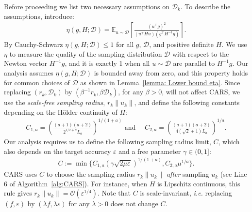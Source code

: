 Before proceeding we list two necessary assumptions on $\mathcal{D}_k$. To describe the assumptions,
introduce:
\begin{align}
    \eta( g, H ; \mathcal{D}) = \mathbb{E}_{u \sim \mathcal{D}} \left[ \frac{(u^\top g)^2}{(u^{\top} H u)  (g^{\top}H^{-1}g) } \right]. \label{eq:Def of eta}
\end{align}
By Cauchy-Schwarz $\eta(g,H;\mathcal{D}) \leq 1$ for all $g$, $\mathcal{D}$, and positive definite $H$.
We use $\eta$ to measure the quality of the sampling distribution $\mathcal{D}$ with respect to the Newton vector $H^{-1}g$, and it is exactly 1 when all $u\sim \mathcal{D}$ are parallel to $H^{-1}g$. Our analysis assumes $\eta(g,H;\mathcal{D})$ is bounded away from zero, and this property holds for common choices of $\mathcal{D}$ as shown in Lemma~\ref{lemma: Lower bound eta}. Since
replacing $(r_k, \mathcal{D}_k)$ by $(\beta^{-1}r_k, \beta\mathcal{D}_k)$, for any $\beta >0$, will not affect CARS, we use the {\em{scale-free sampling radius}}, $r_k\|u_k\|$,
and define the following constants depending on the H\"{o}lder continuity of $H$:
\begin{align*}
    C_{1,a} = \left(\frac{(a+1)(a+2)}{2^{1/2+a}L_{a}}\right)^{1/(1+a)} \text{ and }\quad C_{2,a} = \left( \frac{(a+1)(a+2)}{4(\sqrt{2}+1)L_{a}} \right)^{1/a}.
\end{align*}
Our analysis requires us to define the following sampling radius limit, $C$, which also depends on the target accuracy $\varepsilon$ and a free parameter $\gamma \in (0,1]$:
\begin{align}\label{eq: Scale-Free Sampling Radius Limit}
    C := \min \{ C_{1,a} (\gamma \sqrt{2\mu \varepsilon})^{1/(1+a)}, C_{2,a} \mu^{1/a} \}.
\end{align}
CARS uses $C$ to choose the sampling radius $r_k\|u_k\|$ {\em after} sampling $u_k$ (see Line 6 of Algorithm~\ref{alg:CARS}). For instance, when $H$ is Lipschitz continuous, this rule gives $r_k \|u_k\| = \mathcal{O}(\varepsilon^{1/4})$. Note that $C$ is scale-invariant, {\em i.e.} replacing $(f, \varepsilon)$ by $(\lambda f, \lambda\varepsilon)$ for any $\lambda>0$ does not change $C$.

